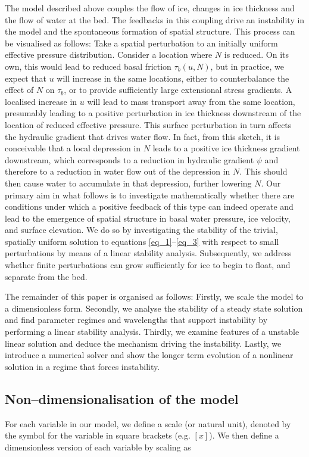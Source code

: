 \documentclass[journal abbreviation, manuscript]{copernicus}
\begin{document}
The model described above couples the flow of ice, changes in ice thickness and 
the flow of water at the bed. The feedbacks in this coupling drive an instability in the model and the spontaneous 
formation of spatial structure. This process can be visualised as follows: Take a spatial perturbation to an 
initially uniform effective pressure distribution. Consider a location where $N$ is reduced. On its own, this would lead to reduced basal 
friction $\tau_b(u,N)$, but in practice, we expect that $u$ will 
increase in the same locations, either to counterbalance the effect of 
$N$ on $\tau_b$, or to provide sufficiently large extensional stress gradients. A localised increase in $u$ will lead to mass transport away 
from the same location, presumably leading to a positive perturbation in 
ice thickness downstream of the location of reduced effective pressure.  
This surface perturbation in turn affects the hydraulic gradient 
that drives water flow. In fact, from this sketch, it is conceivable 
that a local depression in $N$ leads to a positive ice thickness 
gradient downstream, which corresponds to a reduction in hydraulic 
gradient $\psi$ and therefore to a reduction in water flow out of the 
depression in $N$. This should then cause water to accumulate in that 
depression, further lowering $N$. Our primary aim in what follows is to 
investigate mathematically whether there are conditions under which a 
positive feedback of this type can indeed operate and lead to the emergence of 
spatial structure in basal water pressure, ice velocity, and surface 
elevation. We do so by investigating the stability of the trivial, 
spatially uniform solution to equations \eqref{eq_1}--\eqref{eq_3} with respect to 
small perturbations by means of a linear stability analysis. 
Subsequently, we address whether finite perturbations can grow 
sufficiently for ice to begin to float, and separate from the bed.

The remainder of this paper is organised as follows:
Firstly, we scale the model to a dimensionless form. Secondly, we analyse the stability of a steady state solution and find parameter 
regimes and wavelengths that support instability by performing a linear stability analysis. Thirdly, we examine features of a unstable linear solution and deduce the mechanism driving the instability. Lastly, we introduce a numerical solver and show the longer term evolution of a nonlinear solution in a regime that forces instability.

\subsection{Non--dimensionalisation of the model} \label{sec:scaling_the_model}
For each variable in our model, we define a scale (or natural 
unit), denoted by the symbol for the variable in square brackets (e.g. $[x]$). 
We then define 
a dimensionless version of each variable by scaling as
\end{document}
